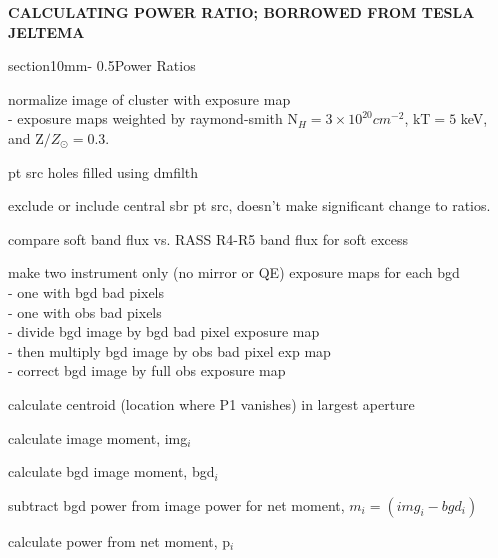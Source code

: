 \documentclass[letterpaper,12pt]{article}
\makeatletter
\renewcommand{\section}{\@startsection%
{section}{1}{0mm}{-\baselineskip}%
{0.5\baselineskip}{\normalfont\Large\bfseries}}%
\makeatother
\begin{document}
\pagestyle{plain}
\begin{center}
\bfseries\uppercase{Calculating Power Ratio; borrowed from Tesla Jeltema}
\end{center}
\section{Power Ratios}
\begin{description}
\item normalize image of cluster with exposure map\\
	- exposure maps weighted by raymond-smith N$_H =
3\times10^{20} cm^{-2}$, kT$ = 5$ keV, and Z$/Z_{\odot} = 0.3$.
\item pt src holes filled using dmfilth
\item exclude or include central sbr pt src, doesn't make significant
change to ratios.
\item compare soft band flux vs. RASS R4-R5 band flux for soft excess
\item make two instrument only (no mirror or QE) exposure maps for each bgd\\
	- one with bgd bad pixels\\
	- one with obs bad pixels\\
	- divide bgd image by bgd bad pixel exposure map\\
	- then multiply bgd image by obs bad pixel exp map\\
	- correct bgd image by full obs exposure map
\item calculate centroid (location where P1 vanishes) in largest aperture
\item calculate image moment, img$_i$
\item calculate bgd image moment, bgd$_i$
\item subtract bgd power from image power for net moment, $m_i = (img_i-bgd_i)$
\item calculate power from net moment, p$_i$
\end{description}
\end{document}
